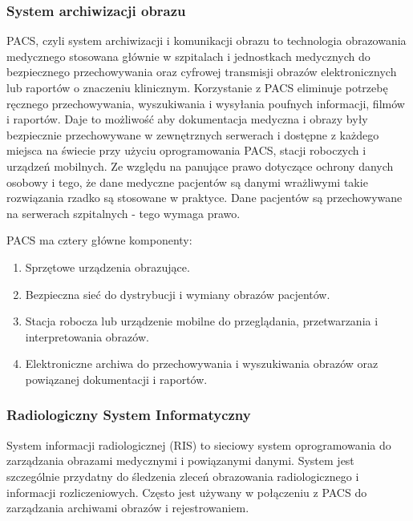 \documentclass[a4paper,11pt,twoside]{report}
\theoremstyle{definition}
\begin{document}
\subsubsection{System archiwizacji obrazu}
PACS, czyli system archiwizacji i komunikacji obrazu to technologia obrazowania medycznego stosowana głównie w szpitalach i jednostkach medycznych do bezpiecznego przechowywania oraz cyfrowej transmisji obrazów elektronicznych lub raportów o znaczeniu klinicznym. Korzystanie z PACS eliminuje potrzebę ręcznego przechowywania, wyszukiwania i wysyłania poufnych informacji, filmów i raportów. Daje to możliwość aby dokumentacja medyczna i obrazy były bezpiecznie przechowywane w zewnętrznych serwerach i dostępne z każdego miejsca na świecie przy użyciu oprogramowania PACS, stacji roboczych i urządzeń mobilnych. Ze względu na panujące prawo dotyczące ochrony danych osobowy i tego, że dane medyczne pacjentów są danymi wrażliwymi takie rozwiązania rzadko są stosowane w praktyce. Dane pacjentów są przechowywane na serwerach szpitalnych - tego wymaga prawo.
\par
PACS ma cztery główne komponenty: 
\begin{enumerate}
	\item Sprzętowe urządzenia obrazujące.
	\item Bezpieczna sieć do dystrybucji i wymiany obrazów pacjentów.
	\item Stacja robocza lub urządzenie mobilne do przeglądania, przetwarzania i interpretowania obrazów.
	\item Elektroniczne archiwa do przechowywania i wyszukiwania obrazów oraz powiązanej dokumentacji i raportów.
\end{enumerate}

\subsubsection{Radiologiczny System Informatyczny}
System informacji radiologicznej (RIS) to sieciowy system oprogramowania do zarządzania obrazami medycznymi i powiązanymi danymi. System jest szczególnie przydatny do śledzenia zleceń obrazowania radiologicznego i informacji rozliczeniowych. Często jest używany w połączeniu z PACS do zarządzania archiwami obrazów i rejestrowaniem.
\end{document}
